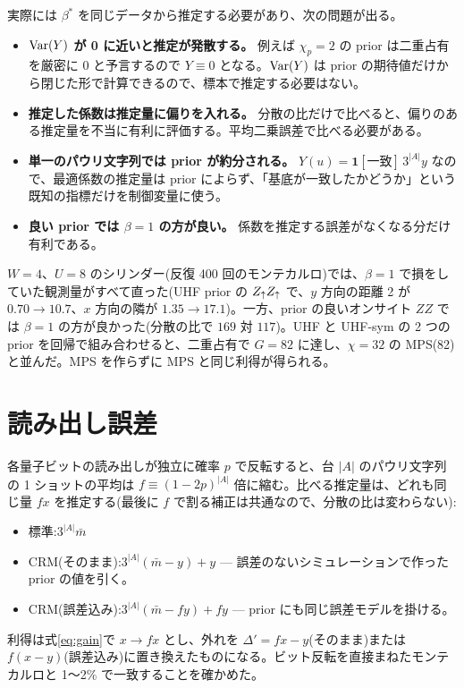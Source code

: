 実際には $\beta^\ast$ を同じデータから推定する必要があり、次の問題が出る。
\begin{itemize}
  \item \textbf{$\operatorname{Var}(Y)$ が 0 に近いと推定が発散する。} 例えば $\chi_p=2$ の prior は二重占有を厳密に 0 と予言するので $Y\equiv0$ となる。$\operatorname{Var}(Y)$ は prior の期待値だけから閉じた形で計算できるので、標本で推定する必要はない。
  \item \textbf{推定した係数は推定量に偏りを入れる。} 分散の比だけで比べると、偏りのある推定量を不当に有利に評価する。平均二乗誤差で比べる必要がある。
  \item \textbf{単一のパウリ文字列では prior が約分される。} $Y(u)=\mathbf 1[\text{一致}]\,3^{\lvert A\rvert}y$ なので、最適係数の推定量は prior によらず、「基底が一致したかどうか」という既知の指標だけを制御変量に使う。
  \item \textbf{良い prior では $\beta=1$ の方が良い。} 係数を推定する誤差がなくなる分だけ有利である。
\end{itemize}
$W=4$、$U=8$ のシリンダー(反復 400 回のモンテカルロ)では、$\beta=1$ で損をしていた観測量がすべて直った(UHF prior の $Z_\uparrow Z_\uparrow$ で、$y$ 方向の距離 2 が $0.70\to10.7$、$x$ 方向の隣が $1.35\to17.1$)。一方、prior の良いオンサイト $ZZ$ では $\beta=1$ の方が良かった(分散の比で $169$ 対 $117$)。UHF と UHF-sym の 2 つの prior を回帰で組み合わせると、二重占有で $G=82$ に達し、$\chi=32$ の MPS(82)と並んだ。MPS を作らずに MPS と同じ利得が得られる。

\section{読み出し誤差}
\label{sec:readout}

各量子ビットの読み出しが独立に確率 $p$ で反転すると、台 $\lvert A\rvert$ のパウリ文字列の 1 ショットの平均は $f\equiv(1-2p)^{\lvert A\rvert}$ 倍に縮む。比べる推定量は、どれも同じ量 $fx$ を推定する(最後に $f$ で割る補正は共通なので、分散の比は変わらない):
\begin{itemize}
  \item 標準:$3^{\lvert A\rvert}\bar m$
  \item CRM(そのまま):$3^{\lvert A\rvert}(\bar m-y)+y$ — 誤差のないシミュレーションで作った prior の値を引く。
  \item CRM(誤差込み):$3^{\lvert A\rvert}(\bar m-fy)+fy$ — prior にも同じ誤差モデルを掛ける。
\end{itemize}
利得は式\eqref{eq:gain}で $x\to fx$ とし、外れを $\Delta'=fx-y$(そのまま)または $f(x-y)$(誤差込み)に置き換えたものになる。ビット反転を直接まねたモンテカルロと 1〜2\% で一致することを確かめた。

